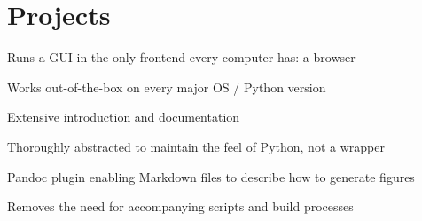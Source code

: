 \section{Projects}

\begin{tightemize}
\item Runs a GUI in the only frontend every computer has: a browser
\item Works out-of-the-box on every major OS / Python version
\item Extensive introduction and documentation
\item Thoroughly abstracted to maintain the feel of Python, not a wrapper
\end{tightemize}

\sectionsep

\begin{tightemize}
\item Pandoc plugin enabling Markdown files to describe how to generate figures
\item Removes the need for accompanying scripts and build processes
\end{tightemize}
\sectionsep
